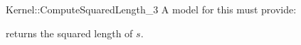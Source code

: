 \begin{ccRefFunctionObjectConcept}{Kernel::ComputeSquaredLength_3}
A model for this must provide:


       {returns the squared length of $s$. }

\ccSeeAlso
{} \\

\end{ccRefFunctionObjectConcept}
